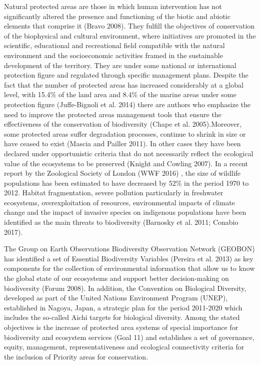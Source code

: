 \documentclass[]{interact}
\theoremstyle{plain}%
\theoremstyle{definition}
\theoremstyle{remark}
\begin{document}
Natural protected areas are those in which human intervention has not
significantly altered the presence and functioning of the biotic and
abiotic elements that comprise it (Bravo 2008). They fulfill the
objectives of conservation of the biophysical and cultural environment,
where initiatives are promoted in the scientific, educational and
recreational field compatible with the natural environment and the
socioeconomic activities framed in the sustainable development of the
territory. They are under some national or international protection
figure and regulated through specific management plans. Despite the fact
that the number of protected areas has increased considerably at a
global level, with 15.4\% of the land area and 8.4\% of the marine areas
under some protection figure (Juffe-Bignoli et al. 2014) there are
authors who emphasize the need to improve the protected areas management
tools that ensure the effectiveness of the conservation of biodiversity
(Chape et al. 2005).Moreover, some protected areas suffer degradation
processes, continue to shrink in size or have ceased to exist (Mascia
and Pailler 2011). In other cases they have been declared under
opportunistic criteria that do not necessarily reflect the ecological
value of the ecosystems to be preserved (Knight and Cowling 2007). In a
recent report by the Zoological Society of London (WWF 2016) , the size
of wildlife populations has been estimated to have decreased by 52\% in
the period 1970 to 2012. Habitat fragmentation, severe pollution
particularly in freshwater ecosystems, overexploitation of resources,
environmental impacts of climate change and the impact of invasive
species on indigenous populations have been identified as the main
threats to biodiversity (Barnosky et al. 2011; Conabio 2017).

The Group on Earth Observations Biodiversity Observation Network
(GEOBON) has identified a set of Essential Biodiversity Variables
(Pereira et al. 2013) as key components for the collection of
environmental information that allow us to know the global state of our
ecosystems and support better decision-making on biodiversity (Forum
2008). In addition, the Convention on Biological Diversity, developed as
part of the United Nations Environment Program (UNEP), established in
Nagoya, Japan, a strategic plan for the period 2011-2020 which includes
the so-called Aichi targets for biological diversity. Among the stated
objectives is the increase of protected area systems of special
importance for biodiversity and ecosystem services (Goal 11) and
establishes a set of governance, equity, management, representativeness
and ecological connectivity criteria for the inclusion of Priority areas
for conservation.
\end{document}
